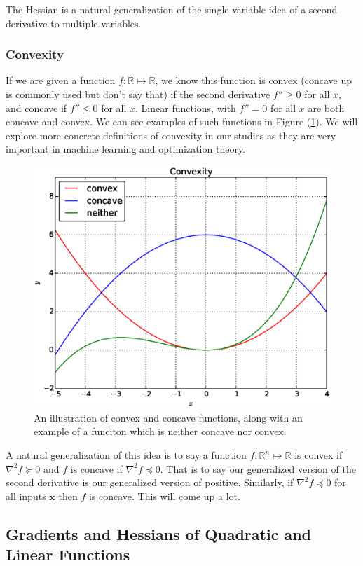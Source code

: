 \documentclass{article}
\newcommand{\1}{\mathbf{1}}
\newcommand{\0}{\mathbf{0}}
\newcommand{\xx}{\mathbf{x}}
\newcommand{\RR}{\mathbb{R}}
\begin{document}
The Hessian is a natural generalization of the single-variable idea of a second derivative to
multiple variables.

\subsubsection{Convexity}

If we are given a function $f : \RR \mapsto \RR$, we know this function is convex (concave up is
commonly used but don't say that) if the second derivative $f'' \geq 0$ for all $x$, and concave if
$f'' \leq 0$ for all $x$. Linear functions, with $f''=0$ for all $x$ are both concave and convex.
We can see examples of such functions in Figure (\ref{fig:convex}). We will explore more concrete
definitions of convexity in our studies as they are very important in machine learning and
optimization theory.\\

\begin{figure}[htpb]
    \centering
    \includegraphics[width=0.8\linewidth]{fig/convexity.eps}
    \caption{An illustration of convex and concave functions, along with
    an example of a funciton which is neither concave nor convex.}
    \label{fig:convex}
\end{figure}

A natural generalization of this idea is to say a function $f : \RR^n \mapsto \RR$ is
convex if $\nabla^2 f \succeq 0$ and $f$ is concave if $\nabla^2 f \preceq 0$. That is
to say our generalized version of the second derivative is our generalized version of
positive. Similarly, if $\nabla^2 f \preceq 0$ for all inputs $\xx$ then $f$ is concave.
This will come up a lot.

\subsection{Gradients and Hessians of Quadratic and Linear Functions}
\end{document}
